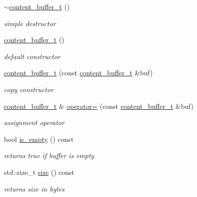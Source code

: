 \begin{DoxyCompactItemize}
\item 
\hyperlink{classpion_1_1http_1_1message_1_1content__buffer__t_a3ea8a034039b47b3cbdbab2591812353}{$\sim$content\-\_\-buffer\-\_\-t} ()
\begin{DoxyCompactList}\small\item\em simple destructor \end{DoxyCompactList}\item 
\hyperlink{classpion_1_1http_1_1message_1_1content__buffer__t_a338e2dbbb2fa4b4ab4eb876837d39d90}{content\-\_\-buffer\-\_\-t} ()
\begin{DoxyCompactList}\small\item\em default constructor \end{DoxyCompactList}\item 
\hyperlink{classpion_1_1http_1_1message_1_1content__buffer__t_a2f0ef54675bfaa620b4900866b8174e3}{content\-\_\-buffer\-\_\-t} (const \hyperlink{classpion_1_1http_1_1message_1_1content__buffer__t}{content\-\_\-buffer\-\_\-t} \&buf)
\begin{DoxyCompactList}\small\item\em copy constructor \end{DoxyCompactList}\item 
\hyperlink{classpion_1_1http_1_1message_1_1content__buffer__t}{content\-\_\-buffer\-\_\-t} \& \hyperlink{classpion_1_1http_1_1message_1_1content__buffer__t_a79d3e130075949cb148734a4435a404a}{operator=} (const \hyperlink{classpion_1_1http_1_1message_1_1content__buffer__t}{content\-\_\-buffer\-\_\-t} \&buf)
\begin{DoxyCompactList}\small\item\em assignment operator \end{DoxyCompactList}\item 
bool \hyperlink{classpion_1_1http_1_1message_1_1content__buffer__t_a709d6984941254634cdb8b3527bb7ad6}{is\-\_\-empty} () const 
\begin{DoxyCompactList}\small\item\em returns true if buffer is empty \end{DoxyCompactList}\item 
std\-::size\-\_\-t \hyperlink{classpion_1_1http_1_1message_1_1content__buffer__t_a4af97b94d9c7a9dabcdb61fcf29a6742}{size} () const 
\begin{DoxyCompactList}\small\item\em returns size in bytes \end{DoxyCompactList}\item 

\end{DoxyCompactItemize}
